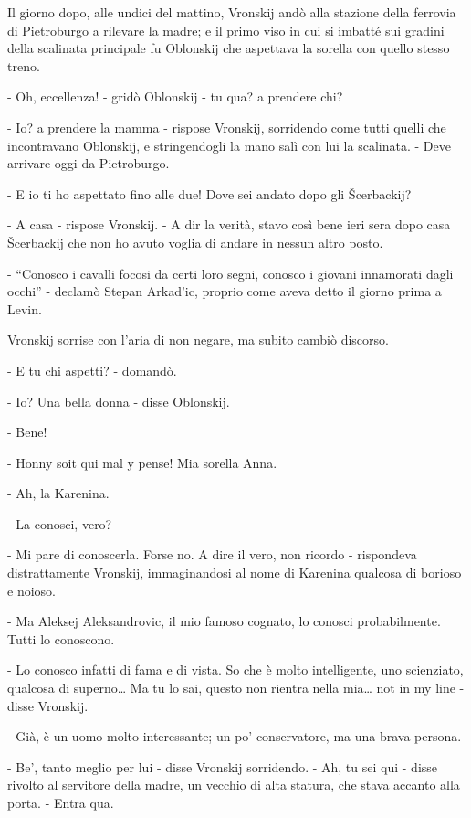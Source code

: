 Il giorno dopo, alle undici del mattino, Vronskij andò alla stazione della ferrovia di Pietroburgo a rilevare la madre; e il primo viso in cui si imbatté sui gradini della scalinata principale fu Oblonskij che aspettava la sorella con quello stesso treno. 

- Oh, eccellenza! - gridò Oblonskij - tu qua? a prendere chi? 

- Io? a prendere la mamma - rispose Vronskij, sorridendo come tutti quelli che incontravano Oblonskij, e stringendogli la mano salì con lui la scalinata. - Deve arrivare oggi da Pietroburgo. 

- E io ti ho aspettato fino alle due! Dove sei andato dopo gli Šcerbackij? 

- A casa - rispose Vronskij. - A dir la verità, stavo così bene ieri sera dopo casa Šcerbackij che non ho avuto voglia di andare in nessun altro posto. 

- ``Conosco i cavalli focosi da certi loro segni, conosco i giovani innamorati dagli occhi'' - declamò Stepan Arkad'ic, proprio come aveva detto il giorno prima a Levin. 

Vronskij sorrise con l'aria di non negare, ma subito cambiò discorso. 

- E tu chi aspetti? - domandò. 

- Io? Una bella donna - disse Oblonskij. 

- Bene! 

- Honny soit qui mal y pense! Mia sorella Anna. 

- Ah, la Karenina. 

- La conosci, vero? 

- Mi pare di conoscerla. Forse no. A dire il vero, non ricordo - rispondeva distrattamente Vronskij, immaginandosi al nome di Karenina qualcosa di borioso e noioso. 

- Ma Aleksej Aleksandrovic, il mio famoso cognato, lo conosci probabilmente. Tutti lo conoscono. 

- Lo conosco infatti di fama e di vista. So che è molto intelligente, uno scienziato, qualcosa di superno\ldots{} Ma tu lo sai, questo non rientra nella mia\ldots{} not in my line - disse Vronskij. 

- Già, è un uomo molto interessante; un po' conservatore, ma una brava persona. 

- Be', tanto meglio per lui - disse Vronskij sorridendo. - Ah, tu sei qui - disse rivolto al servitore della madre, un vecchio di alta statura, che stava accanto alla porta. - Entra qua. 

